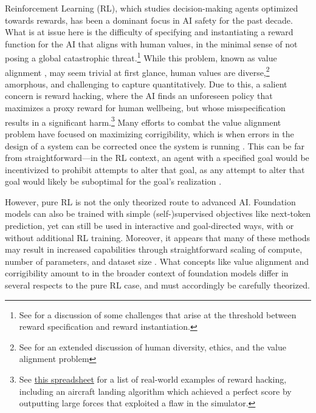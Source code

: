 Reinforcement Learning (RL), which studies decision-making agents optimized towards rewards, has been a dominant focus in AI safety for the past decade. What is at issue here is the difficulty of specifying and instantiating a reward function for the AI that aligns with human values, in the minimal sense of not posing a global catastrophic threat.\footnote{See \citet{Hubinger2019RisksFL} for a discussion of some challenges that arise at the threshold between reward specification and reward instantiation.} While this problem, known as value alignment \citep{gabriel2020artificial, yudkowsky2016ai}, may seem trivial at first glance, human values are diverse,\footnote{See \citet{gabriel2020artificial} for an extended discussion of human diversity, ethics, and the value alignment problem} amorphous, and challenging to capture quantitatively. Due to this, a salient concern is reward hacking, where the AI finds an unforeseen policy that maximizes a proxy reward for human wellbeing, but whose misspecification results in a significant harm.\footnote{See \href{https://docs.google.com/spreadsheets/d/e/2PACX-1vRPiprOaC3HsCf5Tuum8bRfzYUiKLRqJmbOoC-32JorNdfyTiRRsR7Ea5eWtvsWzuxo8bjOxCG84dAg/pubhtml}{this spreadsheet} for a list of real-world examples of reward hacking, including an aircraft landing algorithm which achieved a perfect score by outputting large forces that exploited a flaw in the simulator.} Many efforts to combat the value alignment problem have focused on maximizing corrigibility, which is when errors in the design of a system can be corrected once the system is running \citep{soares2015corrigibility}. This can be far from straightforward—in the RL context, an agent with a specified goal would be incentivized to prohibit attempts to alter that goal, as any attempt to alter that goal would likely be suboptimal for the goal’s realization \citep{Omohundro2008TheBA}.


However, pure RL is not the only theorized route to advanced AI. Foundation models can also be trained with simple (self-)supervised objectives like next-token prediction, yet can still be used in interactive and goal-directed ways, with or without additional RL training. Moreover, it appears that many of these methods may result in increased capabilities through straightforward scaling of compute, number of parameters, and dataset size \citep{Hestness2017DeepLS, kaplan2020}. What concepts like value alignment and corrigibility amount to in the broader context of foundation models differ in several respects to the pure RL case, and must accordingly be carefully theorized. 


